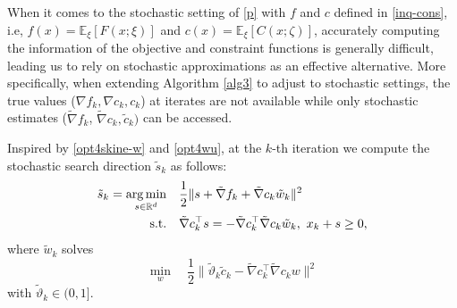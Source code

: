 \documentclass[11pt]{article}
\def\red#1{\textcolor{red}{#1}}
\newcommand{\R}{\mathbb{R}}
\newcommand{\E}{\mathbb{E}}
\newcommand{\argmin}{\mathop{\mathrm{arg\,min}}}
\newcommand{\be}{\begin{equation}}
\newcommand{\ee}{\end{equation}}
\begin{document}
When it comes to the stochastic setting of \eqref{p} with $f$ and $c$ defined in \eqref{inq-cons}, i.e,  $f(x)=\E_\xi[F(x;\xi)]$ and $ c(x)=\E_\xi[C(x;\zeta)]$, 
accurately computing the  information of the objective and constraint functions is generally difficult, leading us to rely on stochastic approximations as an effective alternative. More specifically, when extending Algorithm \ref{alg3} to adjust to stochastic settings, the true values  (\( \nabla f_k, \nabla c_k , c_k \)) at iterates are not available while only  stochastic estimates   (\( \tilde{\nabla} f_k \), \( \tilde{\nabla} c_k, \tilde c_k) \) can be accessed. 

Inspired by \eqref{opt4skine-w} and \eqref{opt4wu}, at the $k$-th iteration  we compute the stochastic {search direction} $\tilde{s}_k$ as follows:
\be\begin{aligned}\label{opt4skine-w-s}
\tilde s_k = \argmin_{s\in\R^d} &\quad \frac{1}{2}\|s+\tilde \nabla f_k + \tilde \nabla c_k \tilde w_k\|^2 \\
~{\rm s.t.} &\quad \tilde \nabla c_k^\top s  = -\tilde \nabla c_k^\top \tilde \nabla c_k \tilde w_k,~
x_k + s \geq 0,
\end{aligned}\ee
where $\tilde w_k$ solves 
\begin{equation}\label{sto-opt4wu}
\min_{w}\quad \frac{1}{2}\| \tilde\vartheta_k\tilde c_k - \tilde \nabla  c_k^\top \tilde \nabla c_k w\|^2
\end{equation}
with $\tilde\vartheta_k\in(0,1].$ 
\end{document}
